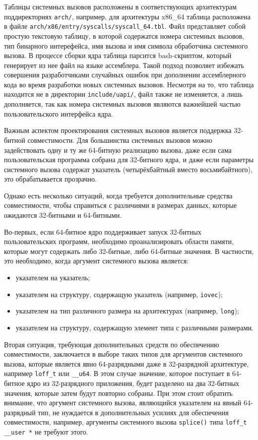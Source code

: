 Таблицы системных вызовов расположены в соответствующих архитектурам
поддиректориях \texttt{arch/}, например, для архитектуры x86\_64 таблица
расположена в файле \texttt{arch/x86/entry/syscalls/syscall\_64.tbl}.
Файл представляет собой простую текстовую таблицу, в которой содержатся
номера системных вызовов, тип бинарного интерефейса, имя вызова и имя символа
обработчика системного вызова. В процессе сборки ядра таблица парсится
bash-скриптом, который генерирует из нее файл на языке ассемблера. Такой подход
позволяет избежать совершения разработчиками случайных ошибок при дополнении
ассемблерного кода во время разработки новых системных вызовов. Несмотря на то,
что таблица находится не в директории \texttt{include/uapi/}, файл также не
изменяется, а лишь дополняется, так как номера системных вызовов являются
важнейшей частью пользовательского интерфейса ядра.

Важным аспектом проектирования системных вызовов является поддержка 32-битной
совместимости. Для большинства системных вызовов можно задействовать одну и ту
же 64-битную реализацию вызова, даже если сама пользовательская программа
собрана для 32-битного ядра, и даже если параметры системного вызова содержат
указатель (четырёхбайтный вместо восьмибайтного), это обрабатывается прозрачно.

Однако есть несколько ситуаций, когда требуется дополнительные средства
совместимости, чтобы справиться с различиями в размерах данных, которые
ожидаются  32-битными и 64-битными.

Во-первых, если 64-битное ядро поддерживает запуск 32-битных пользовательских
программ, необходимо проанализировать области памяти, которые могут содержать
либо 32-битные, либо 64-битные значения. В частности, это необходимо, когда
аргумент системного вызова является:
\begin{itemize}
\item указателем на указатель;
\item указателем на структуру, содержащую указатель (например, \texttt{iovec});
\item указателем на тип различного размера на архитектурах (например,
  \texttt{long});
\item указателем на структуру, содержащую элемент типа с различными размерами.
\end{itemize}

Вторая ситуация, требующая дополнительных средств по обеспечению совместимости,
заключается в выборе таких типов для аргументов системного вызова, которые
является явно 64-разрядными даже в 32-разрядной архитектуре, например
\texttt{loff\_t} или \texttt{\_\_u64}. В этом случае значение, которое поступает
в 64-битное ядро из 32-разрядного приложения, будет разделено на два 32-битных
значения, которые затем будут повторно собраны. При этом стоит обратить
внимание, что аргумент системного вызова, являющийся указателем на явный
64-разрядный тип, не нуждается в дополнительных усилиях для обеспечения
совместимости, например, аргументы системного вызова \texttt{splice()} типа
\texttt{loff\_t \_\_user *} не требуют этого.

